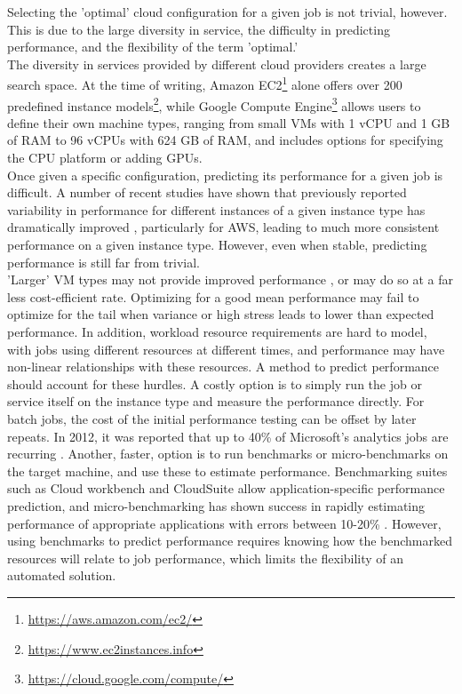 \documentclass{article}
\begin{document}
Selecting the 'optimal' cloud configuration for a given job is not trivial, however. This is due to the large diversity in service, the difficulty in predicting performance, and the flexibility of the term 'optimal.' \\
The diversity in services provided by different cloud providers creates a large search space. At the time of writing, Amazon EC2\footnote{\url{https://aws.amazon.com/ec2/}} alone offers over 200 predefined instance models\footnote{\url{https://www.ec2instances.info}}, while Google Compute Engine\footnote{\url{https://cloud.google.com/compute/}} allows users to define their own machine types, ranging from small VMs with 1 vCPU and 1 GB of RAM to 96 vCPUs with 624 GB of RAM, and includes options for specifying the CPU platform or adding GPUs. \\
Once given a specific configuration, predicting its performance for a given job is difficult. A number of recent studies have shown that previously reported variability \cite{Leitner2014} in performance for different instances of a given instance type has dramatically improved \cite{Scheuner2018,Davatz2017,Laaber2019}, particularly for AWS, leading to much more consistent performance on a given instance type. However, even when stable, predicting performance is still far from trivial. \\ 'Larger' VM types may not provide improved performance \cite{Yadwadkar2017}, or may do so at a far less cost-efficient rate. Optimizing for a good mean performance may fail to optimize for the tail when variance or high stress leads to lower than expected performance. In addition, workload resource requirements are hard to model, with jobs using different resources at different times, and performance may have non-linear relationships with these resources\cite{Alipourfard2017}. A method to predict performance should account for these hurdles.
A costly option is to simply run the job or service itself on the instance type and measure the performance directly. For batch jobs, the cost of the initial performance testing can be offset by later repeats. In 2012, it was reported that up to 40\% of Microsoft's analytics jobs are recurring \cite{Agarwal2012,Ferguson2012b}. Another, faster, option is to run benchmarks or micro-benchmarks on the target machine, and use these to estimate performance. Benchmarking suites such as Cloud workbench \cite{Scheuner2018a} and CloudSuite \cite{Palit2016} allow application-specific performance prediction, and micro-benchmarking has shown success in rapidly estimating performance of appropriate applications with errors between 10-20\% \cite{Scheuner2018, Varghese2016a, Varghese2016}. However, using benchmarks to predict performance requires knowing how the benchmarked resources will relate to job performance, which limits the flexibility of an automated solution. \\
\end{document}
